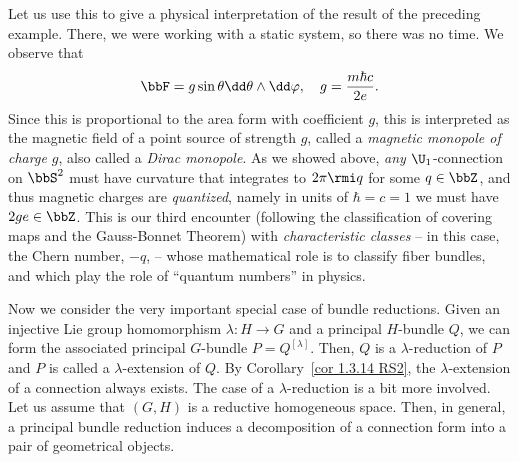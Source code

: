 \begin{example}
    Let us use this to give a physical interpretation of the result of the preceding example. There, we were working with a static system, so there was no time. We observe that
    \[\bbF =g\sin\theta \dd\theta\wedge\dd\varphi,\quad g=\frac{m\hbar c}{2e}.\]
    Since this is proportional to the area form with coefficient $g$, this is interpreted as the magnetic field of a point source of strength $g$, called a \emph{magnetic monopole of charge $g$}, also called a \emph{Dirac monopole}. As we showed above, \emph{any} $\U_1$-connection on $\bbS^2$ must have curvature that integrates to $2\pi \rmi q$ for some $q\in \bbZ$, and thus magnetic charges are \emph{quantized}, namely in units of $\hbar=c=1$ we must have $2ge\in\bbZ$. This is our third encounter (following the classification of covering maps and the Gauss-Bonnet Theorem) with \emph{characteristic classes} -- in this case, the Chern number, $-q$, -- whose mathematical role is to classify fiber bundles, and which play the role of ``quantum numbers'' in physics.
\end{example}


Now we consider the very important special case of bundle reductions. Given an injective Lie group homomorphism $\lambda:H\to G$ and a principal $H$-bundle $Q$, we can form the associated principal $G$-bundle $P=Q^{[\lambda]}$. Then, $Q$ is a $\lambda$-reduction of $P$ and $P$ is called a $\lambda$-extension of $Q$. By Corollary~\ref{cor 1.3.14 RS2}, the $\lambda$-extension of a connection always exists. The case of a $\lambda$-reduction is a bit more involved. Let us assume that $(G,H)$ is a reductive homogeneous space. Then, in general, a principal bundle reduction induces a decomposition of a connection form into a pair of geometrical objects.

